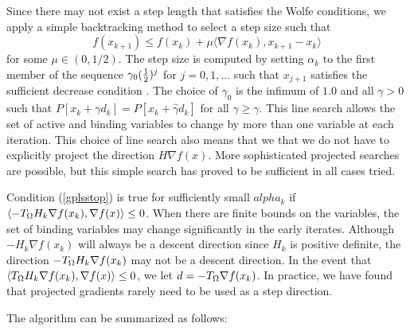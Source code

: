 Since there may not exist a step length that satisfies the Wolfe conditions,
we apply a simple backtracking method to select a step size such that
\begin{equation}  \label{gplsstop}
 f(x_{k+1}) \leq f(x_k) + \mu
\langle \nabla f(x_k), x_{k+1} - x_k \rangle
\end{equation}
for some $\mu \in (0, 1/2 )$.
The step size is computed by setting $ \alpha_k $
to the first member of the sequence
$ \gamma_0 ( {\textstyle{\frac{1}{2}}} ) ^ j $ for $ j = 0, 1, \ldots $ such that
$ x_{j+1} $ satisfies the sufficient decrease condition .
The choice of $\gamma_0$ is the infimum of $1.0$ and all
$\gamma > 0$ such that
$P [x_k + \gamma {d_k} ] = P [x_k + \hat \gamma {d_k}] $  
for all $\hat \gamma \geq  \gamma$.
This line search allows the set of active and binding variables to
change by more than one variable at each iteration.  This choice
of line search also means that we that we do not have to
explicitly project the direction $H \nabla f(x)$.
More sophisticated projected searches are possible,
but this simple search has proved to be sufficient in all cases tried.

Condition (\ref{gplsstop}) is true for sufficiently small $alpha_k$ if 
$\langle - T_{\Omega} H_k \nabla f(x_k) , \nabla f(x) \rangle \leq 0$.
When there are finite bounds on the variables, the set of
binding variables may
change significantly in the early iterates.
Although $-H_k \nabla f(x_k)$ will always be a
descent direction since $H_k$ is positive definite,
the direction $-T_{\Omega} H_k \nabla f(x_k)$
may not be a descent direction.
In the event that 
$\langle T_{\Omega} H_k \nabla f(x_k) , \nabla f(x) \rangle \leq 0$,
we let $d=-T_{\Omega} \nabla f(x_k)$.  
In  practice, we have found that projected gradients rarely
need to be used as a step direction.

The algorithm can be summarized as follows:

